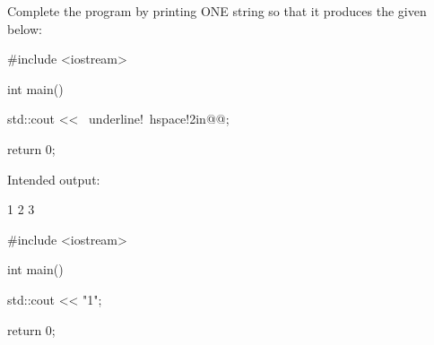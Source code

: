 \nextq
Complete the program by printing
ONE string so that
it produces the given below:
\begin{console}[commandchars=\~\!\@,fontsize=\small]
#include <iostream>

int main()
{
    std::cout << ~underline!~hspace!2in@@;

    return 0;
}
\end{console}
Intended output:
\begin{console}[fontsize=\small]
1
2
3
\end{console}
\ANSWER
\begin{answercode}
#include <iostream>

int main()
{
  std::cout << "1\n";
  
  return 0;
}
\end{answercode}


